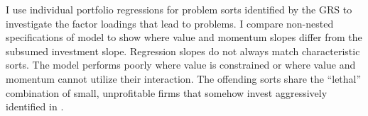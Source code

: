 I use individual portfolio regressions for problem sorts identified by the GRS to
investigate the factor loadings that lead to problems. I compare non-nested specifications
of model to show where value and momentum slopes differ from the subsumed investment
slope. Regression slopes do not always match characteristic sorts. The model performs
poorly where value is constrained or where value and momentum cannot utilize their
interaction. The offending sorts share the ``lethal” combination of small, unprofitable
firms that somehow invest aggressively identified in \textcite{fama2015five}.

